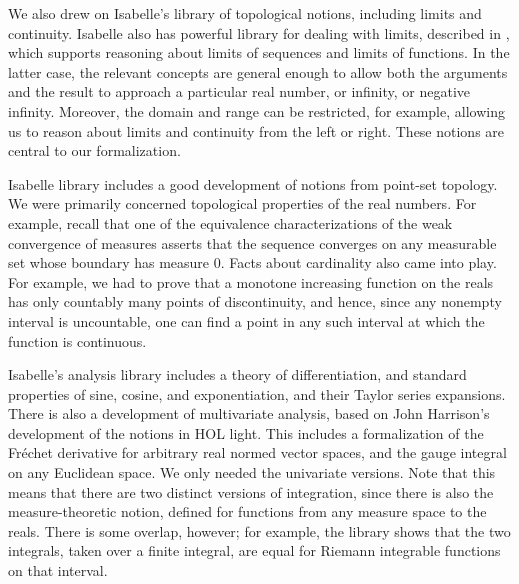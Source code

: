 \documentclass{article}
\begin{document}
We also drew on Isabelle's library of topological notions, including limits and continuity. Isabelle also has powerful library for dealing with limits, described in \cite{hoelzl2013typeclasses}, which supports reasoning about limits of sequences and limits of functions. In the latter case, the relevant concepts are general enough to allow both the arguments and the result to approach a particular real number, or infinity, or negative infinity. Moreover, the domain and range can be restricted, for example, allowing us to reason about limits and continuity from the left or right. These notions are central to our formalization.

Isabelle library includes a good development of notions from point-set topology. We were primarily concerned topological properties of the real numbers. For example, recall that one of the equivalence characterizations of the weak convergence of measures asserts that the sequence converges on any measurable set whose boundary has measure $0$. Facts about cardinality also came into play. For example, we had to prove that a monotone increasing function on the reals has only countably many points of discontinuity, and hence, since any nonempty interval is uncountable, one can find a point in any such interval at which the function is continuous. 

Isabelle's analysis library includes a theory of differentiation, and standard properties of sine, cosine, and exponentiation, and their Taylor series expansions. There is also a development of multivariate analysis, based on John Harrison's development of the notions in HOL light. This includes a formalization of the Fr\'echet derivative for arbitrary real normed vector spaces, and the gauge integral on any Euclidean space. We only needed the univariate versions. Note that this means that there are two distinct versions of integration, since there is also the measure-theoretic notion, defined for functions from any measure space to the reals. There is some overlap, however; for example, the library shows that the two integrals, taken over a finite integral, are equal for Riemann integrable functions on that interval.
\end{document}
